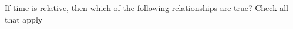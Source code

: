 
\checkboxchar{$\Box$}
\question[1] If time is relative, then which of the following 
relationships are true? Check all that apply

\begin{checkboxes}
\end{checkboxes} 


